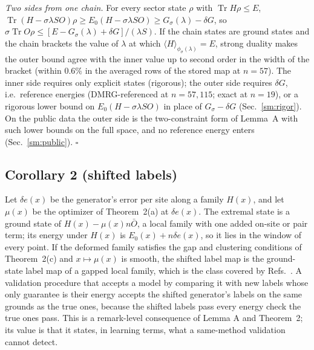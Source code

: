 \documentclass[aps,prx,onecolumn,10pt,nofootinbib,longbibliography,floatfix]{revtex4-2}
\theoremstyle{remark}
\newcommand{\de}{\delta e}
\newcommand{\Tr}{\operatorname{Tr}}
\begin{document}
\emph{Two sides from one chain.} For every sector state $\rho$ with $\Tr H\rho\le E$,
$\Tr(H-\sigma\lambda SO)\rho\ge E_0(H-\sigma\lambda SO)\ge G_\sigma(\lambda)-\delta G$, so %
$\sigma\Tr O\rho\le[E-G_\sigma(\lambda)+\delta G]/(\lambda S)$. If the chain states are ground states and the chain
brackets the value of $\lambda$ at which $\langle H\rangle_{\phi_\sigma(\lambda)}=E$, strong duality makes the outer
bound agree with the inner value up to second order in the width of the bracket (within $0.6\%$ in the averaged %
rows of the stored map at $n=57$). The inner side requires only explicit states (rigorous); the outer side requires
$\delta G$, i.e.\ reference energies (DMRG-referenced at $n=57,115$; exact at $n=19$), or a rigorous lower bound %
on $E_0(H-\sigma\lambda SO)$ in place of $G_\sigma-\delta G$ (Sec.~\ref{sm:rigor}). On the public data the outer side
is the two-constraint form of Lemma~A with such lower bounds on the full space, and no reference energy enters
(Sec.~\ref{sm:public}). \hfill$\square$

\subsection{Corollary 2 (shifted labels)} %
Let $\de(x)$ be the generator's error per site along a family $H(x)$, and let $\mu(x)$ be the optimizer of
Theorem~2(a) at $\de(x)$. The extremal state is a ground state of $H(x)-\mu(x)n\bar O$, a local family with one added %
on-site or pair term; its energy under $H(x)$ is $E_0(x)+n\de(x)$, so it lies in the window of every point. If the %
deformed family satisfies the gap and clustering conditions of Theorem~2(c) and $x\mapsto\mu(x)$ is smooth, the shifted label map is %
the ground-state label map of a gapped local family, which is the class covered by
Refs.~\cite{huang2022,lewis2024,wanner2024}. A validation procedure that accepts a model by comparing it with new %
labels whose only guarantee is their energy accepts the shifted generator's labels on the same grounds as the true
ones, because the shifted labels pass every energy check the true ones pass. This is a remark-level consequence of
Lemma A and Theorem~2; its value is that it states, in learning terms, what a same-method validation cannot detect. %
\end{document}
